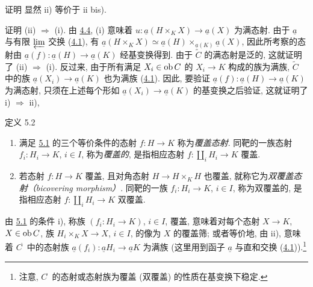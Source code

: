 \begin{enonce*}[remark]{证明}
显然 ii) 等价于 ii bis).
\end{enonce*}

证明 (ii) $\Rightarrow$ (i).
由 \hyperref[II.theo4.4]{4.4}, (i) 意味着
$u:\underline{a}(H\times_K X)\rightarrow \underline{a}(X)$ 为满态射.
由于 $\underline{a}$ 与有限 $\varprojlim$ 交换
(\hyperref[II.theo4.1]{4.1}), 有
$\underline{a}(H\times_K X)\simeq
\underline{a}(H)\times_{\underline{a}(K)}\underline{a}(X)$,
因此所考察的态射由
$\underline{a}(f):\underline{a}(H)\rightarrow
\underline{a}(K)$ 经基变换得到.
由于 $\widetilde{C}$ 的满态射是泛的,
这就证明了 (ii) $\Rightarrow$ (i).
反过来, 由于所有满足 $X_i\in\operatorname{ob} C$ 的 $X_i\rightarrow K$
构成的族为满族,
$\widetilde{C}$ 中的族
$\underline{a}(X_i)\rightarrow \underline{a}(K)$ 也为满族
(\hyperref[II.theo4.1]{4.1}).
因此, 要验证
$\underline{a}(f):\underline{a}(H)\rightarrow \underline{a}(K)$ 为满态射,
只须在上述每个形如
$\underline{a}(X_i)\rightarrow \underline{a}(K)$ 的基变换之后验证,
这就证明了 i) $\Rightarrow$ ii), \cqfd

\begin{enonce*}{定义 5.2}
\begin{enumerate}
\renewcommand{\labelenumi}{\theenumi)}
\item 满足 \hyperref[II.prop5.1]{5.1} 的三个等价条件的态射
$f:H\rightarrow K$ 称为\emph{覆盖态射}.
同靶的一族态射 $f_i:H_i\rightarrow K$, $i\in I$,
称为\emph{覆盖的}, 是指相应态射 $f:\amalg_i H_i\rightarrow K$ 覆盖.

\item 若态射 $f:H\rightarrow K$ 覆盖,
且对角态射 $H\rightarrow H\times_K H$ 也覆盖,
就称它为\emph{双覆盖态射（bicovering morphism）}.
同靶的一族 $f_i:H_i\rightarrow K$, $i\in I$,
称为双覆盖的, 是指相应态射 $f:\amalg_i H_i\rightarrow K$ 双覆盖.
\end{enumerate}
\end{enonce*}

由 \hyperref[II.prop5.1]{5.1} 的条件 i),
称族 $(f_i:H_i\rightarrow K)$, $i\in I$, 覆盖,
意味着对每个态射 $X\rightarrow K$, $X\in \operatorname{ob} C$,
族 $H_i\times_K X\rightarrow X$, $i\in I$,
的像为\pageoriginale{} $X$ 的覆盖筛;
或者等价地, 由 ii),
意味着 $C^{\widetilde{\phantom{,}}}$ 中的态射族
$\underline{a}(f_i):\underline{a}H_i\rightarrow
\underline{a}K$ 为满族
(这里用到函子 $\underline{a}$ 与直和交换
(\hyperref[II.theo4.1]{4.1})).\footnote[1]{注意,
$C^{\widehat{\phantom{,}}}$ 的态射或态射族为覆盖
(\resp 双覆盖) 的性质在基变换下稳定.}

